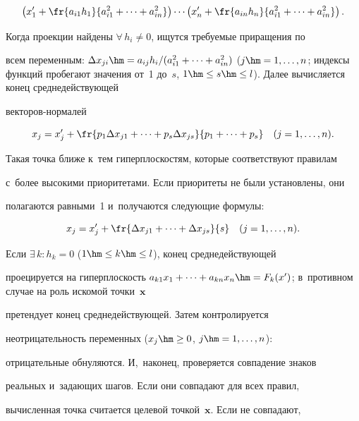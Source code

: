   $$


\left(x_1^\prime + \fr{a_{i1}h_1}{a_{i1}^2 +\cdots+ a_{in}^2}\right)\cdots \left(


x_n^\prime + \fr{a_{in}h_n }{a_{i1}^2 +\cdots + a_{in}^2}\right).


  $$


Когда проекции найдены $\forall \,h_i\not=0$, ищутся требуемые приращения по 


всем переменным: $\Delta x_{ji}\hm = a_{ij}h_i/(a_{i1}^2 +\cdots + a_{in}^2)$ ($j \hm= 


1,\ldots , n$; индексы функций пробегают значения от~1 до~$s$, $1 \hm\leq s 


\hm\leq l$). Далее вычисляется конец среднедействующей  


век\-то\-ров-нор\-малей 


  $$


x_j = x_j^\prime + \fr{p_1\Delta x_{j1} + \cdots + p_s\Delta x_{js}}{p_1 +\cdots + p_s}\quad   


(j = 1,\ldots , n).


  $$


Такая точка ближе к~тем гиперплоскостям, которые соответствуют правилам 


с~более высокими приоритетами. Если приоритеты не были установлены, они 


полагаются равными~1 и~получаются следующие формулы: 


  $$


  x_j=  x_j^\prime + \fr{\Delta x_{j1} + \cdots + \Delta x_{js}}{s}\quad  (j = 1,\ldots , n).


  $$


  


  Если $\exists\,k: h_k = 0$ ($1 \hm\leq k \hm\leq l$), конец среднедействующей 


проецируется на гиперплоскость $a_{k1}x_1 + \cdots + a_{kn}x_n \hm= 


F_k(x^\prime)$; в~противном случае на роль искомой точки~$\bm{x}$ 


претендует конец среднедействующей. Затем контролируется 


неотрицательность переменных ($x_j \hm\geq 0$, $j \hm= 1,\ldots , n$): 


отрицательные обнуляются. И,~наконец, проверяется совпадение знаков 


реальных и~за\-да\-ющих шагов. Если они совпадают для всех правил, 


вычисленная точ\-ка считается целевой точ\-кой~$\bm{x}$. Если не совпадают, 


